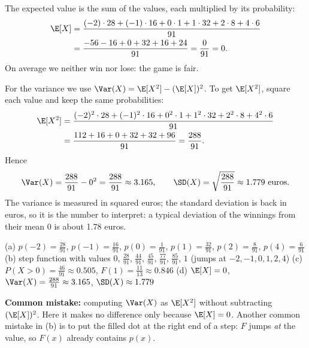 \begin{solution}
	 The expected value is the sum of the values, each multiplied by
	its probability:
	\[ \begin{aligned}
			\E[X] & =\frac{(-2)\cdot28+(-1)\cdot16+0\cdot1+1\cdot32+2\cdot8+4\cdot6}{91} \\
			      & =\frac{-56-16+0+32+16+24}{91}=\frac{0}{91}=0.
		\end{aligned} \]
	On average we neither win nor lose: the game is fair.

	For the variance we use $\Var(X)=\E[X^2]-(\E[X])^2$. To get $\E[X^2]$,
	square each value and keep the same probabilities:
	\[ \begin{aligned}
			\E[X^2] & =\frac{(-2)^2\cdot28+(-1)^2\cdot16+0^2\cdot1+1^2\cdot32
			+2^2\cdot8+4^2\cdot6}{91} \\
			        & =\frac{112+16+0+32+32+96}{91}=\frac{288}{91}.
		\end{aligned} \]
	Hence
	\[ \Var(X)=\frac{288}{91}-0^2=\frac{288}{91}\approx3.165,\qquad
		\SD(X)=\sqrt{\frac{288}{91}}\approx1.779 \text{ euros}. \]
	The variance is measured in squared euros; the standard deviation is back
	in euros, so it is the number to interpret: a typical deviation of the
	winnings from their mean 0 is about 1.78 euros.
	\begin{answer}
		(a) $p(-2)=\frac{28}{91}$, $p(-1)=\frac{16}{91}$, $p(0)=\frac{1}{91}$,
		$p(1)=\frac{32}{91}$, $p(2)=\frac{8}{91}$, $p(4)=\frac{6}{91}$
		\quad (b) step function with values $0$, $\frac{28}{91}$, $\frac{44}{91}$,
		$\frac{45}{91}$, $\frac{77}{91}$, $\frac{85}{91}$, $1$ (jumps at
		$-2,-1,0,1,2,4$)
		\quad (c) $P(X>0)=\frac{46}{91}\approx0.505$, $F(1)=\frac{11}{13}\approx0.846$
		\quad (d) $\E[X]=0$, $\Var(X)=\frac{288}{91}\approx3.165$,
		$\SD(X)\approx1.779$
	\end{answer}
	\begin{remark}
		\textbf{Common mistake:} computing $\Var(X)$ as $\E[X^2]$ without
		subtracting $(\E[X])^2$. Here it makes no difference only because
		$\E[X]=0$. Another common mistake in (b) is to put the filled dot at the
		right end of a step: $F$ jumps \emph{at} the value, so $F(x)$ already
		contains $p(x)$.
	\end{remark}
\end{solution}
